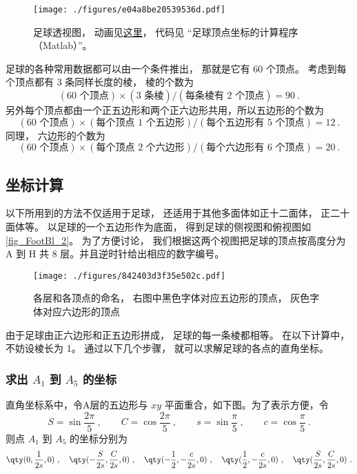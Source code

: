 


\begin{figure}[ht]
\centering
\texttt{[image: ./figures/e04a8be20539536d.pdf]}
\caption{足球透视图， 动画见\href{https://wuli.wiki/apps/football.html}{这里}， 代码见 “足球顶点坐标的计算程序（Matlab）”。} \label{fig_FootBl_1}
\end{figure}

足球的各种常用数据都可以由一个条件推出， 那就是它有 60 个顶点。 考虑到每个顶点都有 3 条同样长度的棱， 棱的个数为
\begin{equation}
(\text{60 个顶点}) \times (\text{3 条棱}) / (\text{每条棱有 2 个顶点}) = 90~.
\end{equation}
另外每个顶点都由一个正五边形和两个正六边形共用，所以五边形的个数为
\begin{equation}
(\text{60 个顶点}) \times (\text{每个顶点 1 个五边形}) / (\text{每个五边形有 5 个顶点}) = 12~.
\end{equation}
同理， 六边形的个数为
\begin{equation}
(\text{60 个顶点}) \times (\text{每个顶点 2 个六边形}) / (\text{每个六边形有 6 个顶点}) = 20~.
\end{equation}


\subsection{坐标计算}
以下所用到的方法不仅适用于足球， 还适用于其他多面体如正十二面体， 正二十面体等。 以足球的一个五边形作为底面， 得到足球的侧视图和俯视图如\autoref{fig_FootBl_2}。 为了方便讨论， 我们根据这两个视图把足球的顶点按高度分为 A 到 H 共 8 层。并且逆时针给出相应的数字编号。

\begin{figure}[ht]
\centering
\texttt{[image: ./figures/842403d3f35e502c.pdf]}
\caption{各层和各顶点的命名， 右图中黑色字体对应五边形的顶点， 灰色字体对应六边形的顶点} \label{fig_FootBl_2}
\end{figure}

由于足球由正六边形和正五边形拼成， 足球的每一条棱都相等。 在以下计算中， 不妨设棱长为 1。 通过以下几个步骤， 就可以求解足球的各点的直角坐标。

\subsubsection{求出 $A_1$ 到 $A_5$ 的坐标}
直角坐标系中，令A层的五边形与 $xy$ 平面重合，如下图。为了表示方便，令
\begin{equation}
S = \sin\frac{2\pi}{5}~, \qquad
C = \cos\frac{2\pi}{5} ~,\qquad
s = \sin\frac{\pi}{5} ~,\qquad
c = \cos\frac{\pi}{5}~.
\end{equation}
则点 $A_1$ 到 $A_5$ 的坐标分别为
\begin{equation}\label{eq_FootBl_5}
\qty(0, \frac{1}{2s}, 0) ~,\quad
\qty(-\frac{S}{2s}, \frac{C}{2s}, 0) ~,\quad
\qty(-\frac12, -\frac{c}{2s}, 0)~, \quad
\qty(\frac12, -\frac{c}{2s}, 0) ~,\quad
\qty(\frac{S}{2s}, \frac{C}{2s}, 0)~.
\end{equation}

